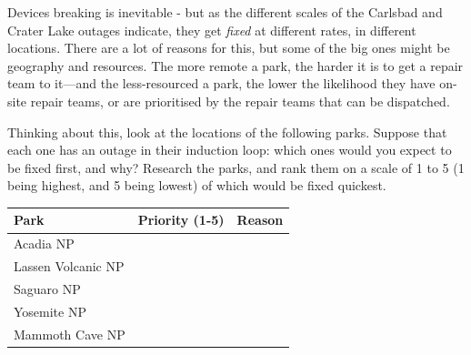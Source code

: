 \documentclass[
  letterpaper,
  DIV=11,
  numbers=noendperiod]{scrartcl}
\begin{document}
Devices breaking is inevitable - but as the different scales of the
Carlsbad and Crater Lake outages indicate, they get \emph{fixed} at
different rates, in different locations. There are a lot of reasons for
this, but some of the big ones might be geography and resources. The
more remote a park, the harder it is to get a repair team to it---and
the less-resourced a park, the lower the likelihood they have on-site
repair teams, or are prioritised by the repair teams that can be
dispatched.

Thinking about this, look at the locations of the following parks.
Suppose that each one has an outage in their induction loop: which ones
would you expect to be fixed first, and why? Research the parks, and
rank them on a scale of 1 to 5 (1 being highest, and 5 being lowest) of
which would be fixed quickest.

\begin{longtable}[]{@{}lll@{}}
\toprule\noalign{}
Park & Priority (1-5) & Reason \\
\midrule\noalign{}
\endhead
\bottomrule\noalign{}
\endlastfoot
Acadia NP & & \\
Lassen Volcanic NP & & \\
Saguaro NP & & \\
Yosemite NP & & \\
Mammoth Cave NP & & \\
\end{longtable}
\end{document}
